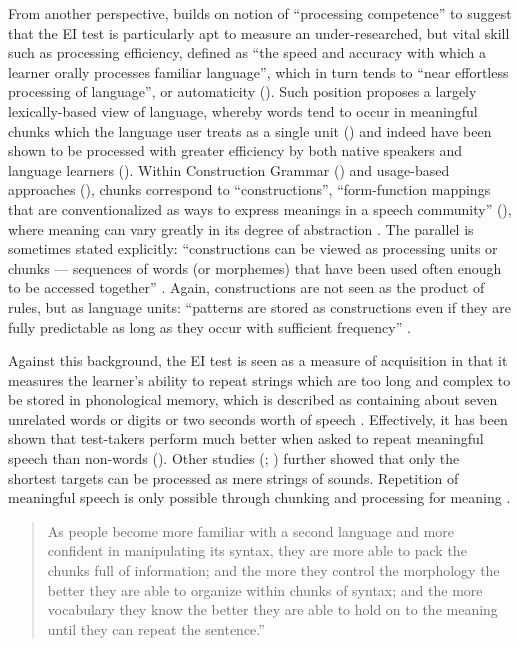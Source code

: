 From another perspective, \citet[325--326]{Van-Moere2012} builds on  notion of “processing competence” to suggest that the EI test is particularly apt to measure an under-researched, but vital skill such as processing efficiency, defined as “the speed and accuracy with which a learner orally processes familiar language”, which in turn tends to “near effortless processing of language”, or automaticity (\citealt{DeKeyser2001}). Such position proposes a largely lexically-based view of language, whereby words tend to occur in meaningful chunks which the language user treats as a single unit (\citealt{PawleySyder1983, Ellis2001}) and indeed have been shown to be processed with greater efficiency by both native speakers and language learners (\citealt{ConklinSchmitt2008}). Within Construction Grammar (\citealt{GriesWulff2005, HoffmannTrousdale2013}) and usage-based approaches (\citealt{Tomasello2005, CadiernoEskildsen2015, TylerOrtega2016}), chunks correspond to “constructions”, “form-function mappings that are conventionalized as ways to express meanings in a speech community” (\citealt[38]{WulffEllis2018}), where meaning can vary greatly in its degree of abstraction \citep{Goldberg2006}. The parallel is sometimes stated explicitly: “constructions can be viewed as processing units or chunks — sequences of words (or morphemes) that have been used often enough to be accessed together” \citep[51]{Bybee2013}. Again, constructions are not seen as the product of rules, but as language units: “patterns are stored as constructions even if they are fully predictable as long as they occur with sufficient frequency” \citep[5]{Goldberg1995}.

Against this background, the EI test is seen as a measure of acquisition in that it measures the learner’s ability to repeat strings which are too long and complex to be stored in phonological memory, which is described as containing about seven unrelated words or digits \citep{Miller1956} or two seconds worth of speech \citep{Baddeley1986}. Effectively, it has been shown that test-takers perform much better when asked to repeat meaningful speech than non-words (\citealt{GathercoleBaddeley2004}). Other studies (\citealt[86]{Underhill1987}; \citealt[79]{Buck2001}) further showed that only the shortest targets can be processed as mere strings of sounds. Repetition of meaningful speech is only possible through chunking and processing for meaning \citep[9]{Radloff1991}.

\begin{quote}As people become more familiar with a second language and more confident in manipulating its syntax, they are more able to pack the chunks full of information; and the more they control the morphology the better they are able to organize within chunks of syntax; and the more vocabulary they know the better they are able to hold on to the meaning until they can repeat the sentence.”\end{quote}

